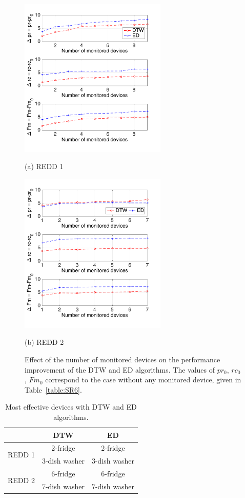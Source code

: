 \begin{figure}[htb]

\begin{minipage}[b]{0.48\linewidth}
  \centering
  \centerline{\includegraphics[width=7cm]{./chapters/chapter5/images/R1_ed_nmodev.pdf}}
  \centerline{(a) REDD 1}\medskip
\end{minipage}
%
\hfill
\begin{minipage}[b]{.48\linewidth}
  \centering
  \centerline{\includegraphics[width=7cm]{./chapters/chapter5/images/R2_ed_nmodev.pdf}}
  \centerline{(b) REDD 2}\medskip
\end{minipage}
\caption{Effect of the number of monitored devices on the performance improvement of the DTW and ED algorithms. The values of $pr_0$, $rc_0$, $Fm_0$ correspond to the case without any monitored device, given in Table~\ref{table:SR6}.}
\label{fig:SR6}
%
\end{figure}


\begin{table}
\caption{Most effective devices with DTW and ED algorithms.}\label{table:SR8}
\begin{center}
\begin{tabular}{|c|c|c|}
\hline
& DTW & ED\\
\hline
\multirow{2}{*}{REDD 1} & 2-fridge &2-fridge \\
& 3-dish washer & 3-dish washer \\
\hline
\multirow{2}{*}{REDD 2}  & 6-fridge&6-fridge \\
& 7-dish washer&7-dish washer \\
\hline
\end{tabular}
\end{center}
\end{table}
